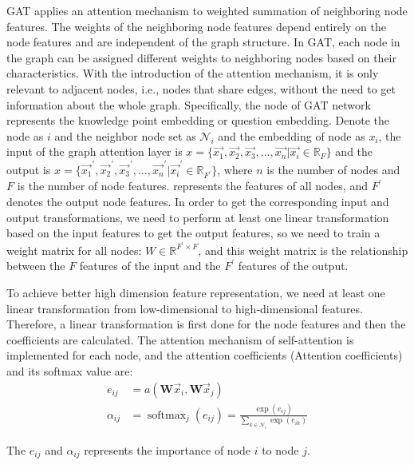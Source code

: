 GAT applies an attention mechanism to weighted summation of neighboring node features. The weights of the neighboring node features depend entirely on the node features and are independent of the graph structure. In GAT, each node in the graph can be assigned different weights to neighboring nodes based on their characteristics. With the introduction of the attention mechanism, it is only relevant to adjacent nodes, i.e., nodes that share edges, without the need to get information about the whole graph. Specifically, the node of GAT network represents the knowledge point embedding or question embedding. Denote the node as \(i\) and the neighbor node set as \(\mathcal{N}_{i}\) and the embedding of node as \(x_i\), the input of the graph attention layer is \(x=\{\overrightarrow{x_{1}}, \overrightarrow{x_{2}}, \overrightarrow{x_{3}}, \ldots, \overrightarrow{x_{n}}|\overrightarrow{x_{i}}\in \mathbb{R}_{F}\}\) and the output is \(x=\{\overrightarrow{x_{1}}^{\prime}, \overrightarrow{x_{2}}^{\prime}, \overrightarrow{x_{3}}^{\prime}, \ldots, \overrightarrow{x_{n}}^{\prime}|\overrightarrow{x_{i}}^\prime\in \mathbb{R}_{F^\prime}\} \), where \(n\) is the number of nodes and \(F\) is the number of node features.  represents the features of all nodes, and \(F^{\prime}\) denotes the output node features. In order to get the corresponding input and output transformations, we need to perform at least one linear transformation based on the input features to get the output features, so we need to train a weight matrix for all nodes: \(W\in \mathbb{R}^{F^{\prime}\times F}\), and this weight matrix is the relationship between the \(F\) features of the input and the \(F^\prime \) features of the output.

To achieve better high dimension feature representation, we need at least one linear transformation from low-dimensional to high-dimensional features. Therefore, a linear transformation is first done for the node features and then the coefficients are calculated. The attention mechanism of self-attention is implemented for each node, and the attention coefficients (Attention coefficients) and its softmax value are:
\begin{align}
	e_{ij}      & =a(\mathbf{W}\vec{x}_{i}, \mathbf{W}\vec{x}_{j})                                                 \\
	\alpha_{ij} & =\operatorname{softmax}_{j}(e_{ij})=\frac{\exp(e_{ij})}{\sum_{k\in \mathcal{N}_{i}}\exp(e_{ik})}
\end{align}

The \(e_{ij}\) and \(\alpha_{ij}\) represents the importance of node \(i\) to node \(j\).

